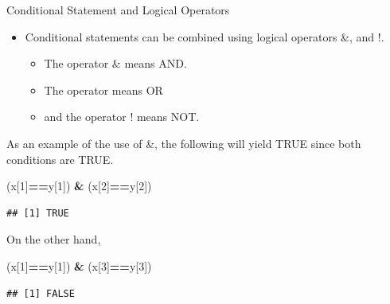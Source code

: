 \documentclass[
  ignorenonframetext,
]{beamer}
\newenvironment{Shaded}{\begin{snugshade}}{\end{snugshade}}
\newcommand{\DecValTok}[1]{\textcolor[rgb]{0.00,0.00,0.81}{#1}}
\newcommand{\NormalTok}[1]{#1}
\newcommand{\SpecialCharTok}[1]{\textcolor[rgb]{0.81,0.36,0.00}{\textbf{#1}}}
\providecommand{\tightlist}{%
  \setlength{\itemsep}{0pt}\setlength{\parskip}{0pt}}
\begin{document}
\begin{frame}[fragile]{Conditional Statement and Logical Operators}
\protect\hypertarget{conditional-statement-and-logical-operators}{}
\begin{itemize}
\item
  Conditional statements can be combined using logical operators \&,
  \textbar{} and !.

  \begin{itemize}
  \tightlist
  \item
    The operator \& means AND.
  \item
    The operator \textbar{} means OR
  \item
    and the operator ! means NOT.
  \end{itemize}
\end{itemize}

As an example of the use of \&, the following will yield TRUE since both
conditions are TRUE.

\small

\begin{Shaded}
\begin{Highlighting}[]
\NormalTok{(x[}\DecValTok{1}\NormalTok{]}\SpecialCharTok{==}\NormalTok{y[}\DecValTok{1}\NormalTok{]) }\SpecialCharTok{\&}\NormalTok{ (x[}\DecValTok{2}\NormalTok{]}\SpecialCharTok{==}\NormalTok{y[}\DecValTok{2}\NormalTok{])}
\end{Highlighting}
\end{Shaded}

\begin{verbatim}
## [1] TRUE
\end{verbatim}

\normalsize

On the other hand, \small

\begin{Shaded}
\begin{Highlighting}[]
\NormalTok{(x[}\DecValTok{1}\NormalTok{]}\SpecialCharTok{==}\NormalTok{y[}\DecValTok{1}\NormalTok{]) }\SpecialCharTok{\&}\NormalTok{ (x[}\DecValTok{3}\NormalTok{]}\SpecialCharTok{==}\NormalTok{y[}\DecValTok{3}\NormalTok{])}
\end{Highlighting}
\end{Shaded}

\begin{verbatim}
## [1] FALSE
\end{verbatim}

\normalsize
\end{frame}
\end{document}
